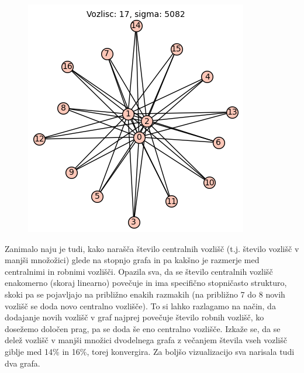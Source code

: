\documentclass[a4paper,12pt]{article}
\begin{document}
\begin{figure}[h]
\begin{minipage}[b]{0.32\textwidth}
      \end{minipage}
      \hfill
      \begin{minipage}[b]{0.32\textwidth}
          \centering
          \includegraphics[width=\textwidth]{graf_tri_centralna.png}
      \end{minipage}
  \end{figure}  

Zanimalo naju je tudi, kako narašča število centralnih vozlišč (t.j. število vozlišč v manjši množožici) glede na stopnjo grafa 
in pa kakšno je razmerje med centralnimi in robnimi vozlišči. Opazila sva, da se število centralnih vozlišč enakomerno (skoraj linearno) 
povečuje in ima specifično stopničasto strukturo, skoki pa se pojavljajo na približno enakih razmakih (na približno 7 
do 8 novih vozlišč se doda novo centralno vozlišče). To si lahko razlagamo na način, da dodajanje novih 
vozlišč v graf najprej povečuje število robnih vozlišč, ko dosežemo določen prag, pa se doda še eno centralno vozlišče. 
Izkaže se, da se delež vozlišč v manjši množici dvodelnega grafa z večanjem števila vseh vozlišč giblje med 14\% in 16\%, torej konvergira.
Za boljšo vizualizacijo sva narisala tudi dva grafa.
\end{document}
